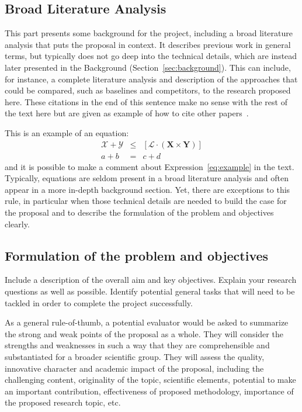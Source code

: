 \documentclass{article}
\newcommand{\cX}{\mathcal{X}}
\newcommand{\cL}{\mathcal{L}}
\newcommand{\cY}{\mathcal{Y}}
\newcommand{\bX}{\mathbf{X}}
\newcommand{\bY}{\mathbf{Y}}
\begin{document}
\subsection{Broad Literature Analysis}\label{sec:broadliterature}

This part presents some background for the project, including a broad literature analysis that puts the proposal in context. It describes previous work in general terms, but typically does not go deep into the technical details, which are instead later presented in the Background (Section~\ref{sec:background}). This can include, for instance, a complete literature analysis and description of the approaches that could be compared, such as baselines and competitors, to the research proposed here. These citations in the end of this sentence make no sense with the rest of the text here but are given as example of how to cite other papers~\citep{al2019predicting,alotaibi2020applications}.

This is an example of an equation:
\begin{eqnarray}
  \label{eq:example}
  \cX + \cY & \leq & \left[ \cL \cdot (\bX \times \bY) \right]\\
  a + b & = & c + d \nonumber
\end{eqnarray}
\noindent
and it is possible to make a comment about Expression~\eqref{eq:example} in the text. Typically, equations are seldom present in a broad literature analysis and often appear in a more in-depth background section. Yet, there are exceptions to this rule, in particular when those technical details are needed to build the case for the proposal and to describe the formulation of the problem and objectives clearly.

\subsection{Formulation of the problem and objectives}

Include a description of the overall aim and key objectives. Explain your research questions as well as possible. Identify potential general tasks that will need to be tackled in order to complete the project successfully.

As a general rule-of-thumb, a potential evaluator would be asked to summarize the strong and weak points of the proposal as a whole. They will consider the strengths and weaknesses in such a way that they are comprehensible and substantiated for a broader scientific group. They will assess the quality, innovative character and academic impact of the proposal, including the challenging content, originality of the topic, scientific elements, potential to make an important contribution, effectiveness of proposed methodology, importance of the proposed research topic, etc.
\end{document}
